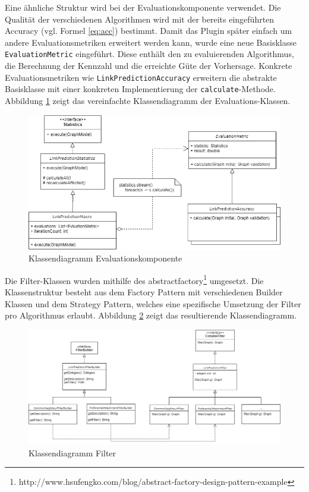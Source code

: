 Eine ähnliche Struktur wird bei der Evaluationskomponente verwendet.
Die Qualität der verschiedenen Algorithmen wird mit der bereits eingeführten Accuracy (vgl. Formel \ref{eq:acc}) bestimmt.
Damit das Plugin später einfach um andere Evaluationsmetriken erweitert werden kann, wurde eine neue Basisklasse \texttt{EvaluationMetric} eingeführt.
Diese enthält den zu evaluierenden Algorithmus, die Berechnung der Kennzahl und die erreichte Güte der Vorhersage. Konkrete Evaluationsmetriken wie \texttt{LinkPredictionAccuracy} erweitern die abstrakte Basisklasse mit einer konkreten Implementierung der \texttt{calculate}-Methode.
Abbildung \ref{fig:class_eval} zeigt das vereinfachte Klassendiagramm der Evaluations-Klassen.
\begin{figure}
    \centering
    \includegraphics[width=\linewidth]{resources/class_Evaluation.png}
    \caption{Klassendiagramm Evaluationskomponente}
    \label{fig:class_eval}
\end{figure}

Die Filter-Klassen wurden mithilfe des \acs{abstractfactory}\footnote{http://www.hsufengko.com/blog/abstract-factory-design-pattern-example} umgesetzt. Die Klassenstruktur besteht aus dem Factory Pattern mit verschiedenen Builder Klassen und dem Strategy Pattern, welches eine spezifische Umsetzung der Filter pro Algorithmus erlaubt. Abbildung \ref{fig:class_filter} zeigt das resultierende Klassendiagramm.
\begin{figure}
    \centering
    \includegraphics[width=\linewidth]{resources/class_Filter.png}
    \caption{Klassendiagramm Filter}
    \label{fig:class_filter}
\end{figure}

